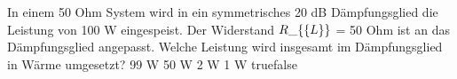     {In einem 50 Ohm System wird in ein symmetrisches 20 dB Dämpfungsglied die Leistung von 100 W eingespeist. Der Widerstand $R\_\{\textrm\{L\}\}$ = 50 Ohm ist an das Dämpfungsglied angepasst. Welche Leistung wird insgesamt im Dämpfungsglied in Wärme umgesetzt?}
    {99 W}
    {50 W}
    {2 W}
    {1 W}
    {true}{false}